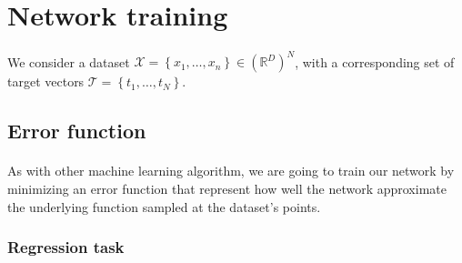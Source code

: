 \documentclass[a4paper]{article}
\begin{document}
	\section{Network training}
	{
		\paragraph{} We consider a dataset $\mathcal{X} = \left\{ x_1, \hdots, x_n\right\}\in\left( \mathbb{R}^D\right)^N$, with a corresponding set of target vectors $\mathcal{T} = \left\{t_1,\hdots, t_N\right\}$. 
		
		\subsection{Error function}
		{
			\paragraph{} As with other machine learning algorithm, we are going to train our network by minimizing an error function that represent how well the network approximate the underlying function sampled at the dataset's points. 
			
			\subsubsection{Regression task}
			{
}}}
\end{document}

